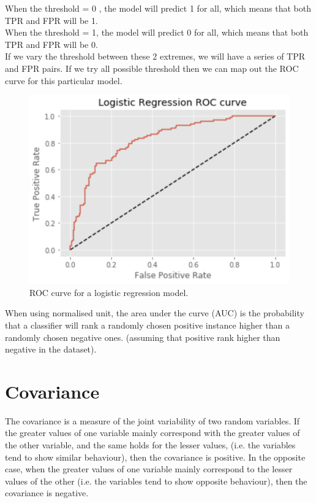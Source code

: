 When the threshold = 0 , the model will predict 1 for all, which means that both TPR and FPR will be 1.\\
When the threshold = 1, the model will predict 0 for all, which means that both TPR and FPR will be 0.\\

If we vary the threshold between these 2 extremes, we will have a series of TPR and FPR pairs. If we try all possible threshold then we can map out the ROC curve for this particular model.

 \begin{figure}[h!]
\begin{center}
	\includegraphics[scale=0.5]{lr_roc.png}
	\caption[]{ROC curve for a logistic regression model.}
	\label{precisionrecall}
	\end{center}
	\end{figure}
	
When using normalised unit, the area under the curve (AUC) is the probability that a classifier will rank a randomly chosen positive instance higher than a randomly chosen negative ones. (assuming that positive rank higher than negative in the dataset).
	
\section{Covariance}

The covariance is a measure of the joint variability of two random variables. If the greater values of one variable mainly correspond with the greater values of the other variable, and the same holds for the lesser values, (i.e. the variables tend to show similar behaviour), then the covariance is positive. In the opposite case, when the greater values of one variable mainly correspond to the lesser values of the other (i.e. the variables tend to show opposite behaviour), then the covariance is negative.

